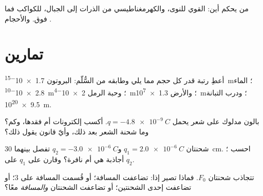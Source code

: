 \begin{omfigure}

{\small من يحكم أين: القوي للنوى، والكهرمغناطيسي من الذرات
إلى الجبال،  للكواكب فما فوق. والأحجام .}
\end{omfigure}

\section{تمارين}

\begin{exercise}[$\star$]\label{exo:g11:fundamental-interactions:1}
أعطِ رتبة قدر كل حجم مما يلي وطابقه من السُّلّم:
البروتون \qty{1.7e-15}{m}؛  الماء \qty{2.8e-10}{m}؛ وحبة الرمل
\qty{2e-4}{m}؛ والأرض \qty{1.3e7}{m}؛ ودرب التبانة \qty{9.5e20}{m}.
\end{exercise}

\begin{exercise}[$\star$]\label{exo:g11:fundamental-interactions:2}
بالون مدلوك على شعر يحمل $q = \qty{-4.8e-9}{C}$. أكسب
إلكترونات أم فقدها، وكم؟ وما شحنة الشعر بعد ذلك،
وأيّ قانون يقول ذلك؟
\end{exercise}

\begin{exercise}[$\star$]\label{exo:g11:fundamental-interactions:3}
شحنتان $q_1 = \qty{+2.0e-6}{C}$ و$q_2 = \qty{-3.0e-6}{C}$ تفصل بينهما
\qty{30}{cm}. احسب ؛ أجاذبة هي أم نافرة؟
وقارن  على $q_1$  على $q_2$.
\end{exercise}

\begin{exercise}[$\star$]\label{exo:g11:fundamental-interactions:4}
تتجاذب شحنتان  $F_0$. فماذا تصير إذا: تضاعفت
المسافة؛ أو قُسمت المسافة على $3$؛ أو تضاعفت إحدى الشحنتين؛
أو تضاعفت الشحنتان \emph{والمسافة} معًا؟
\end{exercise}

